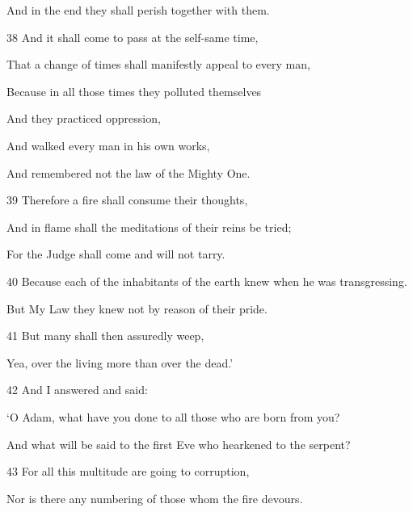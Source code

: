 \par And in the end they shall perish together with them.

\par 38 And it shall come to pass at the self-same time,

\par That a change of times shall manifestly appeal to every man,

\par Because in all those times they polluted themselves

\par And they practiced oppression,

\par And walked every man in his own works,

\par And remembered not the law of the Mighty One.

\par 39 Therefore a fire shall consume their thoughts,

\par And in flame shall the meditations of their reins be tried;

\par For the Judge shall come and will not tarry.

\par 40 Because each of the inhabitants of the earth knew when he was transgressing.

\par But My Law they knew not by reason of their pride.

\par 41 But many shall then assuredly weep,

\par Yea, over the living more than over the dead.’

\par 42 And I answered and said:

\par ‘O Adam, what have you done to all those who are born from you?

\par And what will be said to the first Eve who hearkened to the serpent?

\par 43 For all this multitude are going to corruption,

\par Nor is there any numbering of those whom the fire devours.

